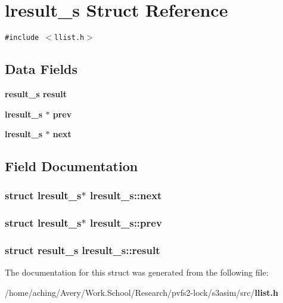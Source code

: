 \section{lresult\_\-s Struct Reference}
\label{structlresult__s}
{\tt \#include $<$llist.h$>$}

\subsection*{Data Fields}
\begin{CompactItemize}
\item 
\bf{result\_\-s} \bf{result}
\item 
\bf{lresult\_\-s} $\ast$ \bf{prev}
\item 
\bf{lresult\_\-s} $\ast$ \bf{next}
\end{CompactItemize}


\subsection{Field Documentation}
\subsubsection{\setlength{\rightskip}{0pt plus 5cm}struct \bf{lresult\_\-s}$\ast$ \bf{lresult\_\-s::next}}\label{structlresult__s_093c42b77eaf9b9097b47084082f238b}


\subsubsection{\setlength{\rightskip}{0pt plus 5cm}struct \bf{lresult\_\-s}$\ast$ \bf{lresult\_\-s::prev}}\label{structlresult__s_cd2fe6030679d9585e81cfd97d57612d}


\subsubsection{\setlength{\rightskip}{0pt plus 5cm}struct \bf{result\_\-s} \bf{lresult\_\-s::result}}\label{structlresult__s_c55fdf263403821528ae380e4fc8e617}




The documentation for this struct was generated from the following file:\begin{CompactItemize}
\item 
/home/aching/Avery/Work.School/Research/pvfs2-lock/s3asim/src/\bf{llist.h}\end{CompactItemize}
